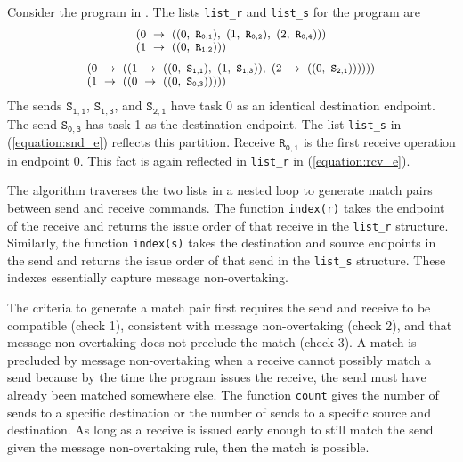 Consider the program in . The lists \texttt{list\_r} and \texttt{list\_s} for the program are
\begin{equation}
\footnotesize \begin{array}{l}
(0\ \rightarrow\ ((0,\ \mathtt{R_{0,1}}),\ (1,\ \mathtt{R_{0,2}}),\ (2,\ \mathtt{R_{0,4}})))\\
(1\ \rightarrow\ ((0,\ \mathtt{R_{1,2}})))\\
\end{array}
\label{equation:rcv_e}
\end{equation}
\begin{equation}
\footnotesize \begin{array}{l}
(0\ \rightarrow\ ((1\ \rightarrow\ ((0,\ \mathtt{S_{1,1}}),\ (1,\ \mathtt{S_{1,3}})),\ (2\ \rightarrow\ ((0,\ \mathtt{S_{2,1}}))))))\\
(1\ \rightarrow\ ((0\ \rightarrow\ ((0,\ \mathtt{S_{0,3}})))))\\
\end{array}
\label{equation:snd_e}
\end{equation}
The sends $\mathtt{S_{1,1}}$, $\mathtt{S_{1,3}}$, and
$\mathtt{S_{2,1}}$ have task 0 as an identical destination
endpoint. The send $\mathtt{S_{0,3}}$ has task 1 as the destination
endpoint. The list \texttt{list\_s} in (\ref{equation:snd_e}) reflects
this partition.  Receive $\mathtt{R_{0,1}}$ is the first receive
operation in endpoint 0. This fact is again reflected
in \texttt{list\_r} in (\ref{equation:rcv_e}).

The algorithm traverses the two lists in a nested loop to generate
match pairs between send and receive commands. The
function \texttt{index(r)} takes the endpoint of the receive and
returns the issue order of that receive in the \texttt{list\_r}
structure. Similarly, the function \texttt{index(s)} takes the
destination and source endpoints in the send and returns the issue
order of that send in the \texttt{list\_s} structure. These indexes
essentially capture message non-overtaking.

The criteria to generate a match pair first requires the send and
receive to be compatible (check 1), consistent with message
non-overtaking (check 2), and that message non-overtaking does not preclude the
match (check 3). A match is precluded by message non-overtaking when a
receive cannot possibly match a send because by the time the program
issues the receive, the send must have already been matched somewhere
else. The function \texttt{count} gives the number of sends to a
specific destination or the number of sends to a specific source and
destination.  As long as a receive is issued early enough to still
match the send given the message non-overtaking rule, then the match
is possible.

